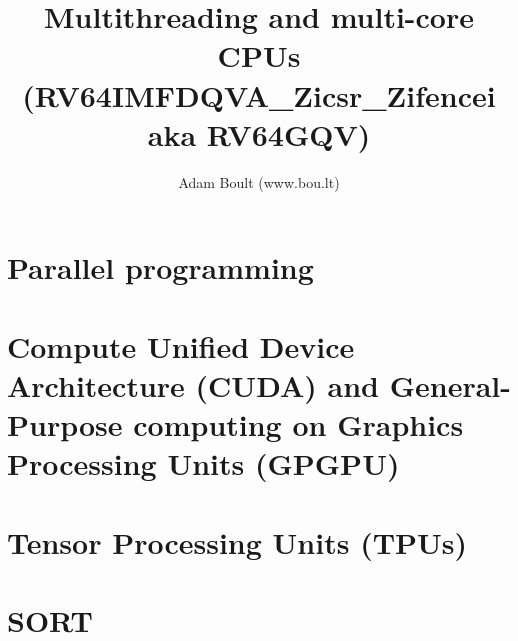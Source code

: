 \documentclass[oneside]{book}
\begin{document}
\author{Adam Boult (www.bou.lt)}
\title{Multithreading and multi-core CPUs (RV64IMFDQVA\_Zicsr\_Zifencei aka RV64GQV)}
\maketitle

\setcounter{tocdepth}{0}
\tableofcontents



\part{Parallel programming}


\part{Compute Unified Device Architecture (CUDA) and General-Purpose computing on Graphics Processing Units (GPGPU)}

\part{Tensor Processing Units (TPUs)}

\part{SORT}

\end{document}
